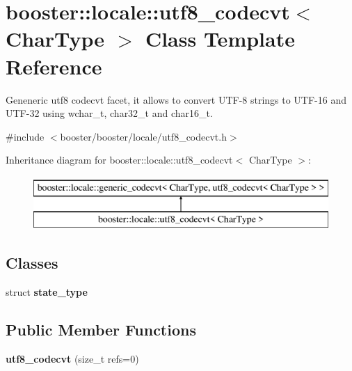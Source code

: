 \section{booster\+:\+:locale\+:\+:utf8\+\_\+codecvt$<$ Char\+Type $>$ Class Template Reference}
\label{classbooster_1_1locale_1_1utf8__codecvt}


Geneneric utf8 codecvt facet, it allows to convert U\+T\+F-\/8 strings to U\+T\+F-\/16 and U\+T\+F-\/32 using wchar\+\_\+t, char32\+\_\+t and char16\+\_\+t.  




{\ttfamily \#include $<$booster/booster/locale/utf8\+\_\+codecvt.\+h$>$}

Inheritance diagram for booster\+:\+:locale\+:\+:utf8\+\_\+codecvt$<$ Char\+Type $>$\+:\begin{figure}[H]
\begin{center}
\leavevmode
\includegraphics[height=2.000000cm]{classbooster_1_1locale_1_1utf8__codecvt}
\end{center}
\end{figure}
\subsection*{Classes}
\begin{DoxyCompactItemize}
\item 
struct {\bf state\+\_\+type}
\end{DoxyCompactItemize}
\subsection*{Public Member Functions}
\begin{DoxyCompactItemize}
\item 
{\bfseries utf8\+\_\+codecvt} (size\+\_\+t refs=0)\label{classbooster_1_1locale_1_1utf8__codecvt_a6dc49939628a0d6a5e216fecfdf3df51}

\end{DoxyCompactItemize}
